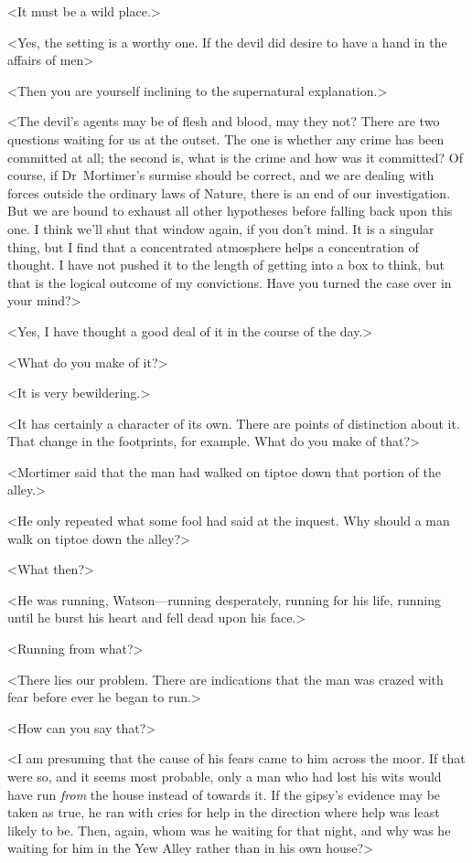 <It must be a wild place.>

<Yes, the setting is a worthy one. If the devil did desire to have a hand in the affairs of men\longdash>

<Then you are yourself inclining to the supernatural explanation.>

<The devil's agents may be of flesh and blood, may they not? There are two questions waiting for us at the outset. The one is whether any crime has been committed at all; the second is, what is the crime and how was it committed? Of course, if Dr~Mortimer's surmise should be correct, and we are dealing with forces outside the ordinary laws of Nature, there is an end of our investigation. But we are bound to exhaust all other hypotheses before falling back upon this one. I think we'll shut that window again, if you don't mind. It is a singular thing, but I find that a concentrated atmosphere helps a concentration of thought. I have not pushed it to the length of getting into a box to think, but that is the logical outcome of my convictions. Have you turned the case over in your mind?>

<Yes, I have thought a good deal of it in the course of the day.>

<What do you make of it?>

<It is very bewildering.>

<It has certainly a character of its own. There are points of distinction about it. That change in the footprints, for example. What do you make of that?>

<Mortimer said that the man had walked on tiptoe down that portion of the alley.>

<He only repeated what some fool had said at the inquest. Why should a man walk on tiptoe down the alley?>

<What then?>

<He was running, Watson—running desperately, running for his life, running until he burst his heart and fell dead upon his face.>

<Running from what?>

<There lies our problem. There are indications that the man was crazed with fear before ever he began to run.>

<How can you say that?>

<I am presuming that the cause of his fears came to him across the moor. If that were so, and it seems most probable, only a man who had lost his wits would have run \emph{from} the house instead of towards it. If the gipsy's evidence may be taken as true, he ran with cries for help in the direction where help was least likely to be. Then, again, whom was he waiting for that night, and why was he waiting for him in the Yew Alley rather than in his own house?>

